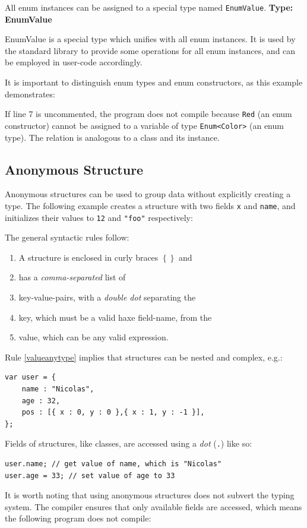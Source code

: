 \documentclass{article}
\newcommand{\type}[1]{\texttt{#1}}
\newcommand{\expr}[1]{\texttt{#1}}
\newenvironment{myshaded}
  {\def\FrameCommand{\fboxsep=\topsep\colorbox{bgcolor}}%
  \MakeFramed {\advance\hsize-\width \FrameRestore}}%
 {\endMakeFramed}
\newcommand{\define}[3][Definition]
	{\begin{myshaded}\noindent\textbf{#1: #2}\par\nobreak\noindent\ignorespaces#3\label{def:#2}\end{myshaded}}
\begin{document}
All enum instances can be assigned to a special type named \type{EnumValue}.
\define[Type]{EnumValue}{EnumValue is a special type which unifies with all enum instances. It is used by the standard library to provide some operations for all enum instances, and can be employed in user-code accordingly.}

It is important to distinguish enum types and enum constructors, as this example demonstrates:


If line 7 is uncommented, the program does not compile because \expr{Red} (an enum constructor) cannot be assigned to a variable of type \type{Enum<Color>} (an enum type). The relation is analogous to a class and its instance.



\subsection{Anonymous Structure}
\label{Anonymous Structure}

Anonymous structures can be used to group data without explicitly creating a type. The following example creates a structure with two fields \expr{x} and \expr{name}, and initializes their values to \expr{12} and \expr{"foo"} respectively:


The general syntactic rules follow:

\begin{enumerate}
	\item A structure is enclosed in curly braces \expr{$\left\{\right\}$} and
	\item has a \emph{comma-separated} list of
	\item key-value-pairs, with a \emph{double dot} separating the
	\item key, which must be a valid haxe field-name, from the
	\item\label{valueanytype} value, which can be any valid expression.
\end{enumerate}
Rule \ref{valueanytype} implies that structures can be nested and complex, e.g.:

\begin{lstlisting}
var user = {
    name : "Nicolas",
    age : 32,
    pos : [{ x : 0, y : 0 },{ x : 1, y : -1 }],
};
\end{lstlisting}
Fields of structures, like classes, are accessed using a \emph{dot} (\expr{.}) like so:

\begin{lstlisting}
user.name; // get value of name, which is "Nicolas"
user.age = 33; // set value of age to 33
\end{lstlisting}
It is worth noting that using anonymous structures does not subvert the typing system. The compiler ensures that only available fields are accessed, which means the following program does not compile:
\end{document}
